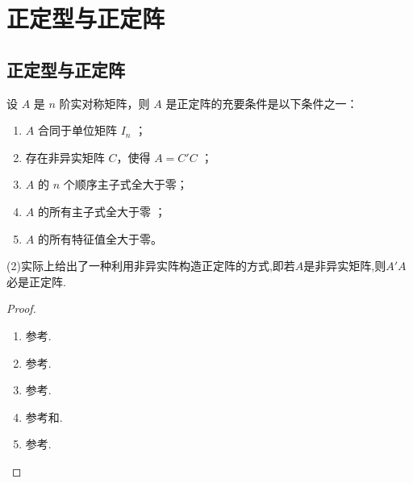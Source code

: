 \documentclass[../../main.tex]{subfiles}%
\begin{document}
\section{正定型与正定阵}

\subsection{正定型与正定阵}

\begin{theorem}[正定阵的判定准则]\label{theorem:正定阵的判定准则}
设 $A$ 是 $n$ 阶实对称矩阵，则 $A$ 是正定阵的充要条件是以下条件之一：
\begin{enumerate}[(1)]
\item $A$ 合同于单位矩阵 $I_n$ ；

\item 存在非异实矩阵 $C$，使得 $A = C'C$ ；

\item $A$ 的 $n$ 个顺序主子式全大于零；

\item $A$ 的所有主子式全大于零 ；

\item $A$ 的所有特征值全大于零。
\end{enumerate} 
\end{theorem}
\begin{remark}
(2)实际上给出了一种利用非异实阵构造正定阵的方式,即若$A$是非异实矩阵,则$A'A$必是正定阵.
\end{remark}
\begin{proof}
\begin{enumerate}[(1)]
\item 参考.

\item 参考.

\item 参考.

\item 参考和.

\item 参考.
\end{enumerate}

\end{proof}
\end{document}
